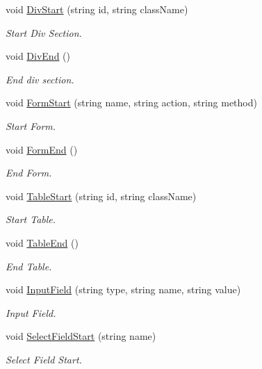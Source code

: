 \begin{DoxyCompactItemize}
void \hyperlink{classHTMLTags_a897512b202cfd12729e8fa24e67ea4d6}{Div\-Start} (string id, string class\-Name)
\begin{DoxyCompactList}\small\item\em Start Div Section. \end{DoxyCompactList}\item 
void \hyperlink{classHTMLTags_aa82b2d3d85b3afd29e5641dbe1ace439}{Div\-End} ()
\begin{DoxyCompactList}\small\item\em End div section. \end{DoxyCompactList}\item 
void \hyperlink{classHTMLTags_a1489ccf4629069eca5e550eeb8e8e887}{Form\-Start} (string name, string action, string method)
\begin{DoxyCompactList}\small\item\em Start Form. \end{DoxyCompactList}\item 
void \hyperlink{classHTMLTags_ab57baef28db9590ce59d0e2f403a210f}{Form\-End} ()
\begin{DoxyCompactList}\small\item\em End Form. \end{DoxyCompactList}\item 
void \hyperlink{classHTMLTags_a9d4bc37c7d615bc1d7f7c738dae48ad3}{Table\-Start} (string id, string class\-Name)
\begin{DoxyCompactList}\small\item\em Start Table. \end{DoxyCompactList}\item 
void \hyperlink{classHTMLTags_a0655d9f70a8c1a61c406280d8fb9df7a}{Table\-End} ()
\begin{DoxyCompactList}\small\item\em End Table. \end{DoxyCompactList}\item 
void \hyperlink{classHTMLTags_ab515d13346f63b00f7696374e682344e}{Input\-Field} (string type, string name, string value)
\begin{DoxyCompactList}\small\item\em Input Field. \end{DoxyCompactList}\item 
void \hyperlink{classHTMLTags_adb6e7ef0a1320dbf6d4acbe1ea3e418f}{Select\-Field\-Start} (string name)
\begin{DoxyCompactList}\small\item\em Select Field Start. \end{DoxyCompactList}\item 

\end{DoxyCompactItemize}
